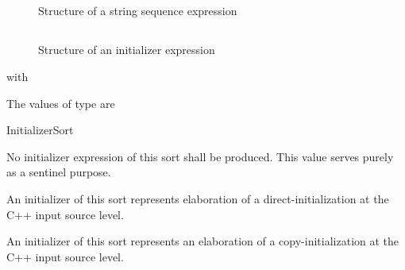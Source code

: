 

\subsection{}
\label{sec:ifc:ExprSort:StringSequence}

\begin{figure}[H]
	\centering
	\caption{Structure of a string sequence expression}
	\label{fig:ifc-string-sequence-structure}
\end{figure}



\subsection{}
\label{sec:ifc:ExprSort:Initializer}

\begin{figure}[H]
	\centering
	\caption{Structure of an initializer expression}
	\label{fig:ifc-initializer-structure}
\end{figure}
with 

The values of type  are
\begin{SortEnum}{InitializerSort}
\end{SortEnum}

No initializer expression of this sort shall be produced.  This value serves purely as a sentinel purpose.

An initializer of this sort represents elaboration of a direct-initialization at the C++ input source level.

An initializer of this sort represents an elaboration of a copy-initialization at the C++ input source level.

